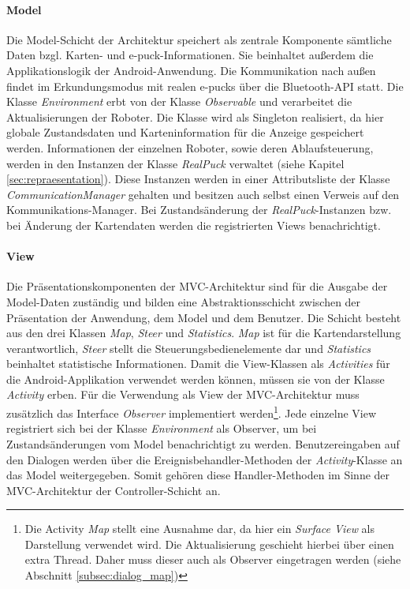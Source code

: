 \documentclass[10pt,a4paper]{article}
\begin{document}
			\paragraph*{Model}
  				Die Model-Schicht der Architektur speichert als zentrale Komponente sämtliche Daten bzgl. Karten- und e-puck-Informationen. 
  				Sie beinhaltet außerdem die Applikationslogik der Android-Anwendung. Die Kommunikation nach außen findet im Erkundungsmodus
  				mit realen e-pucks über die Bluetooth-API statt. Die Klasse \textit{Environment} erbt von der Klasse \textit{Observable} und verarbeitet
  				die Aktualisierungen der Roboter. Die Klasse wird als Singleton realisiert, da hier globale Zustandsdaten und Karteninformation
  				für die Anzeige gespeichert werden. Informationen der einzelnen Roboter, sowie deren Ablaufsteuerung, werden in den Instanzen
  				der Klasse \textit{RealPuck} verwaltet (siehe Kapitel \ref{sec:repraesentation}). Diese Instanzen werden in einer Attributsliste der Klasse
  				\textit{CommunicationManager} gehalten und besitzen auch selbst einen Verweis auf den Kommunikations-Manager. Bei Zustandsänderung
  				der \textit{RealPuck}-Instanzen bzw. bei Änderung der Kartendaten werden die registrierten Views benachrichtigt.
  			\paragraph*{View}
  				Die Präsentationskomponenten der MVC-Architektur sind für die Ausgabe der Model-Daten zuständig und bilden eine
  				Abstraktionsschicht zwischen der Präsentation der Anwendung, dem Model und dem Benutzer. Die Schicht besteht aus den drei
  				Klassen	\textit{Map}, \textit{Steer} und \textit{Statistics}. \textit{Map} ist für die Kartendarstellung
  				verantwortlich, \textit{Steer} stellt die Steuerungsbedienelemente dar und \textit{Statistics} beinhaltet statistische
  				Informationen.  Damit die View-Klassen als \textit{Activities} für die Android-Applikation verwendet werden können, müssen sie
  				von der Klasse \textit{Activity} erben. Für die Verwendung als View der MVC-Architektur muss zusätzlich das Interface
  				\textit{Observer} implementiert werden\footnote{Die Activity \textit{Map} stellt eine Ausnahme dar, da hier ein \textit{Surface View} als
  				Darstellung verwendet wird. Die Aktualisierung geschieht hierbei über einen extra Thread. Daher muss dieser auch als Observer eingetragen
  				werden (siehe Abschnitt \ref{subsec:dialog_map})}. Jede einzelne View registriert sich bei der Klasse \textit{Environment} als Observer,
  				um bei Zustandsänderungen vom Model benachrichtigt zu werden. Benutzereingaben auf den Dialogen werden über
  				die Ereignisbehandler-Methoden der \textit{Activity}-Klasse an das Model weitergegeben. Somit gehören diese Handler-Methoden
  				im Sinne der MVC-Architektur der Controller-Schicht an.
\end{document}

